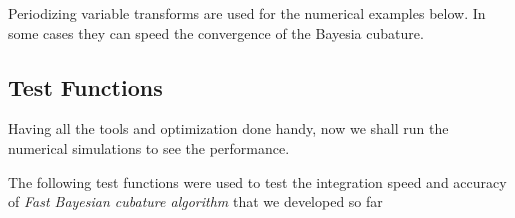 \documentclass[twocolumn]{svjour3}          %
\begin{document}
Periodizing variable transforms are used for the numerical examples below.  In some cases they can speed the convergence of the Bayesia cubature.
	




\subsection{Test Functions}
\label{sec:numerical_experiments}

Having all the tools and optimization done handy, now we shall run the numerical simulations to see the performance.


The following test functions were used to test the integration speed and accuracy of \textit{Fast Bayesian cubature algorithm} that we developed so far
\end{document}
